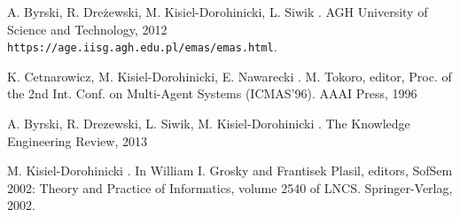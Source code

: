 \begin{thebibliography}{1}
A. Byrski, R. Dreżewski, M. Kisiel-Dorohinicki, L. Siwik
.
\newblock  AGH University of Science and Technology, 2012
\newblock \\\texttt{https://age.iisg.agh.edu.pl/emas/emas.html}.


K. Cetnarowicz, M. Kisiel-Dorohinicki, E. Nawarecki
.
\newblock  M. Tokoro, editor, Proc. of the 2nd Int. Conf. on Multi-Agent Systems (ICMAS'96). AAAI Press, 1996


 A. Byrski, R. Drezewski, L. Siwik, M. Kisiel-Dorohinicki
.
\newblock The Knowledge Engineering Review, 2013


M. Kisiel-Dorohinicki
.
\newblock In William I. Grosky and Frantisek Plasil, editors, SofSem 2002: Theory and Practice of Informatics, volume 2540 of LNCS. Springer-Verlag, 2002.

\end{thebibliography}
